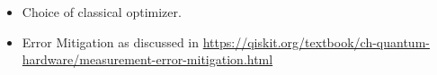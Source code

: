 \documentclass{article}
\begin{document}
\begin{itemize}
\item Choice of classical optimizer.
\item Error Mitigation as discussed in \url{https://qiskit.org/textbook/ch-quantum-hardware/measurement-error-mitigation.html}


\end{itemize}



\end{document}
